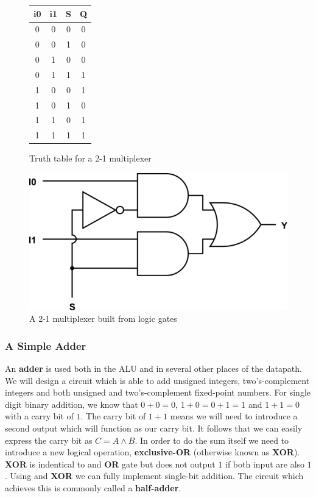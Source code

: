 \documentclass{article}
\begin{document}
	\begin{figure}[ht]
		\begin{minipage}[t]{0.45\textwidth}
			\centering
			\begin{tabular}{c c | c | c}
				i0 & i1 & S & Q \\ \hline
				0 & 0 & 0 & 0 \\
				0 & 0 & 1 & 0 \\
				0 & 1 & 0 & 0 \\
				0 & 1 & 1 & 1 \\
				1 & 0 & 0 & 1 \\
				1 & 0 & 1 & 0 \\
				1 & 1 & 0 & 1 \\
				1 & 1 & 1 & 1 \\
			\end{tabular}
			\caption{Truth table for a 2-1 multiplexer}
		\label{fig:2 1 multiplexer}
		\end{minipage}
		\hfill
		\begin{minipage}[t]{0.45\textwidth}
			\includegraphics[width=1\textwidth]{2_1_multiplexer}
			\caption{A 2-1 multiplexer built from logic gates}
			\label{fig:2 1 multiplexer}
		\end{minipage}
	\end{figure}
	
	\subsubsection{A Simple Adder}
	An \textbf{adder} is used both in the ALU and in several other places of the datapath. We will design a circuit which is able to add unsigned integers, two's-complement integers and both unsigned and two's-complement fixed-point numbers. For single digit binary addition, we know that $0 + 0 = 0$, $1 + 0 = 0 + 1 = 1$ and $1 + 1 = 0$ with a carry bit of $1$. The carry bit of $1 + 1$ means we will need to introduce a second output which will function as our carry bit. It follows that we can easily express the carry bit as $C = A \wedge B$. In order to do the sum itself we need to introduce a new logical operation, \textbf{exclusive-OR} (otherwise known as \textbf{XOR}). \textbf{XOR} is indentical to and \textbf{OR} gate but does not output $1$ if both input are also $1$. Using and \textbf{XOR} we can fully implement single-bit addition. The circuit which achieves this is commonly called a \textbf{half-adder}.
	
\end{document}
